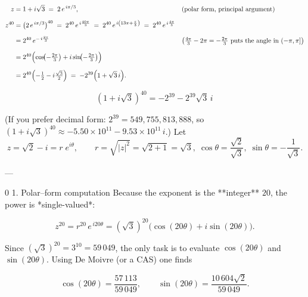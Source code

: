\documentclass[12pt]{article}
\theoremstyle{definition} %
\theoremstyle{plain} %
\begin{document}
    \pagebreak
\[
  \begin{aligned}
  z &= 1+i\sqrt3
       \;=\;
       2\,e^{\,i\pi/3},          &&\text{(polar form, principal argument)}\\[6pt]
  z^{40} 
     &= \bigl(2\,e^{\,i\pi/3}\bigr)^{40}
       \;=\;
       2^{40}\,e^{\,i\frac{40\pi}{3}}
       \;=\;
       2^{40}\,e^{\,i\left(13\pi+\frac{\pi}{3}\right)}
       \;=\;
       2^{40}\,e^{\,i\frac{4\pi}{3}}\\[6pt]
     &= 2^{40}\,
        e^{-\,i\frac{2\pi}{3}}
        &&\bigl(\tfrac{4\pi}{3}-2\pi=-\tfrac{2\pi}{3}\text{ puts the angle in }(-\pi,\pi]\bigr)\\[6pt]
     &= 2^{40}
        \Bigl(\cos\!\bigl(-\tfrac{2\pi}{3}\bigr)+
              i\sin\!\bigl(-\tfrac{2\pi}{3}\bigr)\Bigr)\\[6pt]
     &= 2^{40}\Bigl(-\tfrac12-i\tfrac{\sqrt3}{2}\Bigr)
        \;=\;
        -2^{39}\Bigl(1+\sqrt3\,i\Bigr).
  \end{aligned}
  \]
  
  \[
  \boxed{\,\displaystyle
          (1+i\sqrt3)^{40}
          = -2^{39} - 2^{39}\sqrt3\,i
         \;}
  \]
  
  (If you prefer decimal form: 
  \(2^{39}=549{,}755{,}813{,}888\), so
  \((1+i\sqrt3)^{40}\approx -5.50\times10^{11}
   -9.53\times10^{11}\,i\).)
\pagebreak
Let  
\[
z=\sqrt{2}-i
      =r\;e^{i\theta},\qquad
      r=\sqrt{|z|^{2}}=\sqrt{2+1}= \sqrt{3},\;
      \cos\theta=\frac{\sqrt2}{\sqrt3},\;
      \sin\theta=-\frac{1}{\sqrt3}.
\]

---

0 1.  Polar–form computation  
Because the exponent is the **integer** \(20\), the power is *single-valued*:

\[
z^{20}
   = r^{20}\,e^{\,i20\theta}
   = (\sqrt3)^{20}\!\bigl(\cos(20\theta)+i\sin(20\theta)\bigr).
\]

Since \((\sqrt3)^{20}=3^{10}=59\,049\), the only task is to evaluate
\(\cos(20\theta)\) and \(\sin(20\theta)\).  
Using De Moivre (or a CAS) one finds

\[
\cos(20\theta)=\frac{57\,113}{59\,049},
\qquad
\sin(20\theta)=\frac{10\,604\sqrt2}{59\,049}.
\]
\end{document}
